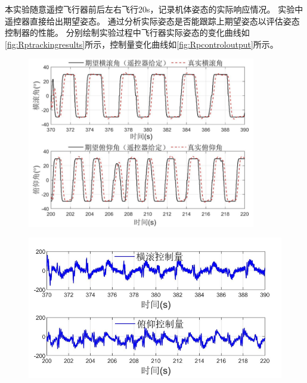 \documentclass[
  type=master
]{gdutthesis}
\begin{document}
本实验随意遥控飞行器前后左右飞行20s，记录机体姿态的实际响应情况。
实验中遥控器直接给出期望姿态。
通过分析实际姿态是否能跟踪上期望姿态以评估姿态控制器的性能。
分别绘制实验过程中飞行器实际姿态的变化曲线如\autoref{fig:Rptrackingresults}所示，控制量变化曲线如\autoref{fig:Rpcontroloutput}所示。
\begin{figure}[H]
	\centering
	\includegraphics[width=0.89\textwidth]{屏幕截图 2022-04-06 150427.png}
	\label{fig:Rptrackingresults}
\end{figure}

\begin{figure}[H]
	\centering
	\includegraphics[width=1.0\textwidth]{屏幕截图 2022-04-06 151409.png}
	\label{fig:Rpcontroloutput}
\end{figure}
\end{document}

